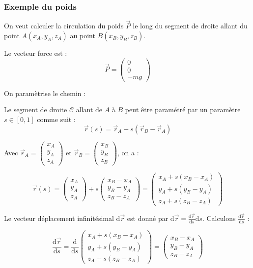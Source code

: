 \documentclass[french]{yLectureNote}
\renewcommand{\vec}{\overrightarrow}
\newcommand{\dd}{\mathrm{d}}
\begin{document}
\subsubsection{Exemple du poids}
On veut calculer la circulation du poids $\vec{P}$ le long du segment de droite allant du point $A(x_A, y_A, z_A)$ au point $B(x_B, y_B, z_B)$.

Le vecteur force est :
$$\vec{P} = \begin{pmatrix} 0 \\ 0 \\ -mg \end{pmatrix}$$

On paramètrise le chemin :

Le segment de droite $\mathcal{C}$ allant de $A$ à $B$ peut être paramétré par un paramètre $s \in [0, 1]$ comme suit :
$$\vec{r}(s) = \vec{r}_A + s (\vec{r}_B - \vec{r}_A)$$

Avec $\vec{r}_A = \begin{pmatrix} x_A \\ y_A \\ z_A \end{pmatrix}$ et $\vec{r}_B = \begin{pmatrix} x_B \\ y_B \\ z_B \end{pmatrix}$, on a :

$$\vec{r}(s) = \begin{pmatrix} x_A \\ y_A \\ z_A \end{pmatrix} + s \begin{pmatrix} x_B - x_A \\ y_B - y_A \\ z_B - z_A \end{pmatrix} = \begin{pmatrix} x_A + s(x_B - x_A) \\ y_A + s(y_B - y_A) \\ z_A + s(z_B - z_A) \end{pmatrix}$$

Le vecteur déplacement infinitésimal $\dd \vec{r}$ est donné par $\dd \vec{r} = \frac{\dd \vec{r}}{\dd s} \dd s$.
Calculons $\frac{\dd \vec{r}}{\dd s}$ :

$$\frac{\dd \vec{r}}{\dd s} = \frac{\dd}{\dd s} \begin{pmatrix} x_A + s(x_B - x_A) \\ y_A + s(y_B - y_A) \\ z_A + s(z_B - z_A) \end{pmatrix} = \begin{pmatrix} x_B - x_A \\ y_B - y_A \\ z_B - z_A \end{pmatrix}$$
\end{document}
